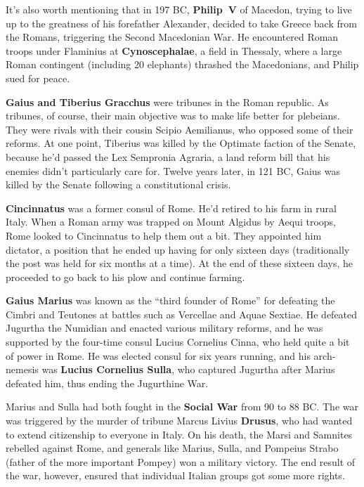 It's also worth mentioning that in 197 BC, \textbf{Philip~V} of Macedon,
trying to live up to the greatness of his forefather Alexander,
decided to take Greece back from the Romans,
triggering the Second Macedonian War.
He encountered Roman troops under Flaminius at \textbf{Cynoscephalae}, a field in Thessaly,
where a large Roman contingent (including 20 elephants) thrashed the Macedonians,
and Philip sued for peace.

\textbf{Gaius and Tiberius Gracchus} were tribunes in the Roman republic.
As tribunes, of course, their main objective was to make life better for plebeians.
They were rivals with their cousin Scipio Aemilianus, who opposed some of their reforms.
At one point, Tiberius was killed by the Optimate faction of the Senate,
because he'd passed the Lex Sempronia Agraria, a land reform bill that his enemies didn't particularly care for.
Twelve years later, in 121 BC, Gaius was killed by the Senate following a constitutional crisis.

\textbf{Cincinnatus} was a former consul of Rome.
He'd retired to his farm in rural Italy.
When a Roman army was trapped on Mount Algidus by Aequi troops,
Rome looked to Cincinnatus to help them out a bit.
They appointed him dictator, a position that he ended up having for only sixteen days
(traditionally the post was held for six months at a time).
At the end of these sixteen days, he proceeded to go back to his plow and continue farming.

\textbf{Gaius Marius} was known as the ``third founder of Rome'' for defeating the Cimbri and Teutones
at battles such as Vercellae and Aquae Sextiae.
He defeated Jugurtha the Numidian and enacted various military reforms,
and he was supported by the four-time consul Lucius Cornelius Cinna,
who held quite a bit of power in Rome.
He was elected consul for six years running, and his arch-nemesis was
\textbf{Lucius Cornelius Sulla}, who captured Jugurtha after Marius defeated him,
thus ending the Jugurthine War.

Marius and Sulla had both fought in the \textbf{Social War} from 90 to 88 BC\@.
The war was triggered by the murder of tribune Marcus Livius \textbf{Drusus},
who had wanted to extend citizenship to everyone in Italy.
On his death, the Marsi and Samnites rebelled against Rome,
and generals like Marius, Sulla, and Pompeius Strabo (father of the more important Pompey)
won a military victory.
The end result of the war, however, ensured that individual Italian groups got some more rights.

